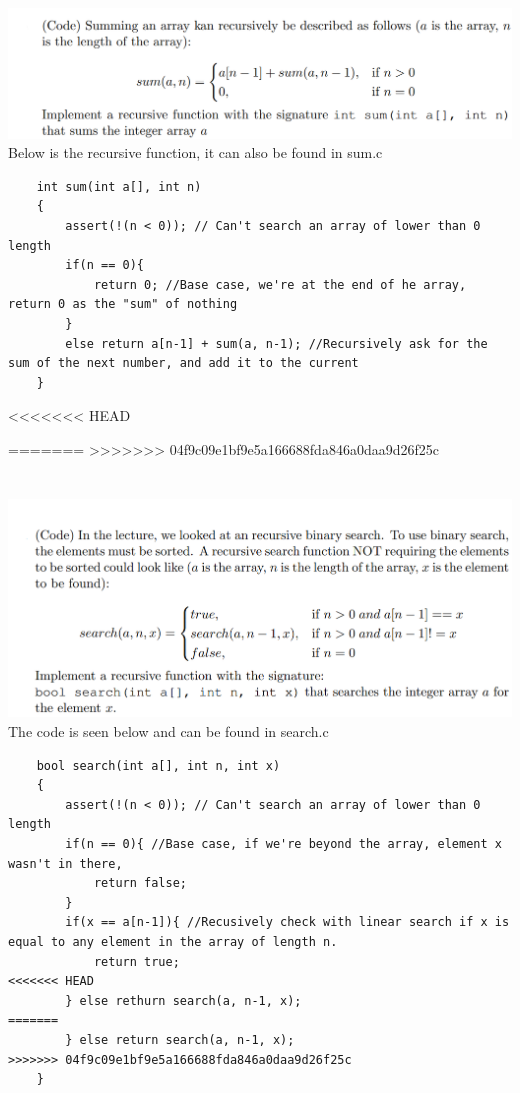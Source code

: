 \documentclass{article}
\begin{document}
\section{}
\includegraphics[width=\linewidth, keepaspectratio=true]{task2}
\vspace{2pt}
Below is the recursive function, it can also be found in sum.c
\begin{lstlisting}
    int sum(int a[], int n)
    {
        assert(!(n < 0)); // Can't search an array of lower than 0 length
        if(n == 0){
            return 0; //Base case, we're at the end of he array, return 0 as the "sum" of nothing
        }
        else return a[n-1] + sum(a, n-1); //Recursively ask for the sum of the next number, and add it to the current
    }
\end{lstlisting}
<<<<<<< HEAD


=======
\pagebreak
>>>>>>> 04f9c09e1bf9e5a166688fda846a0daa9d26f25c
\section{}
\includegraphics[width=\linewidth, keepaspectratio=true]{task3} 
The code is seen below and can be found in search.c
\begin{lstlisting}
    bool search(int a[], int n, int x)
    {
        assert(!(n < 0)); // Can't search an array of lower than 0 length
        if(n == 0){ //Base case, if we're beyond the array, element x wasn't in there,
            return false;
        }
        if(x == a[n-1]){ //Recusively check with linear search if x is equal to any element in the array of length n.
            return true;
<<<<<<< HEAD
        } else rethurn search(a, n-1, x);
=======
        } else return search(a, n-1, x);
>>>>>>> 04f9c09e1bf9e5a166688fda846a0daa9d26f25c
    }
\end{lstlisting}
\vspace{1cm}
\end{document}
